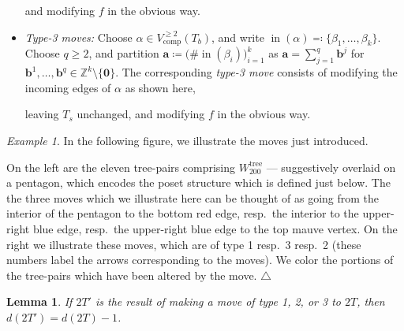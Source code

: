 \documentclass[11pt]{amsart}
\newtheorem{lemma}[theorem]{Lemma}
\theoremstyle{definition}
\theoremstyle{remark}
\newtheorem{example}[theorem]{Example}
\theoremstyle{plain}
\newcommand{\bZ}{\mathbb{Z}}
\newcommand\ba{\mathbf{a}}
\newcommand\bb{\mathbf{b}}
\newcommand\bzero{\mathbf{0}}
\newcommand{\on}{\operatorname}
\newcommand{\comp}{C^2}
\renewcommand{\comp}{{\on{comp}}}
\newcommand{\incom}{\on{in}}
\newcommand{\tree}{{\on{tree}}}
\begin{document}
\begin{itemize}
\noindent and modifying $f$ in the obvious way.

\medskip

\item[] {\emph{Type-3 moves:}} Choose $\alpha \in V^{\geq2}_\comp(T_b)$, and write $\incom(\alpha) \eqqcolon \{\beta_1,\ldots,\beta_k\}$.
Choose $q \geq 2$, and partition $\ba \coloneqq \bigl(\#\!\incom(\beta_i)\bigr)_{i=1}^k$ as $\ba = \sum_{j=1}^q \bb^j$ for $\bb^1,\ldots,\bb^q \in \bZ^k\setminus\{\bzero\}$.
The corresponding {\emph{type-3 move}} consists of modifying the incoming edges of $\alpha$ as shown here,

\begin{figure}[H]
\centering
\def\svgwidth{0.5\columnwidth}

\label{fig:2T_move_3}
\end{figure}

\noindent leaving $T_s$ unchanged, and modifying $f$ in the obvious way.
\end{itemize}


\begin{example}
\label{ex:tree-pair_moves}
In the following figure, we illustrate the moves just introduced.
\begin{figure}[H]
\centering
\def\svgwidth{0.9\columnwidth}

\label{fig:tree_move_examples}
\end{figure}
\noindent
On the left are the eleven tree-pairs comprising $W_{200}^\tree$ --- suggestively overlaid on a pentagon, which encodes the poset structure which is defined just below.
The the three moves which we illustrate here can be thought of as going from the interior of the pentagon to the bottom red edge, resp.\ the interior to the upper-right blue edge, resp.\ the upper-right blue edge to the top mauve vertex.
On the right we illustrate these moves, which are of type 1 resp.\ 3 resp.\ 2 (these numbers label the arrows corresponding to the moves).
We color the portions of the tree-pairs which have been altered by the move.
\null\hfill$\triangle$
\end{example}


\begin{lemma}
\label{lem:Wn_moves}
If $2T'$ is the result of making a move of type 1, 2, or 3 to $2T$, then $d(2T') = d(2T)-1$.
\end{lemma}
\end{document}
